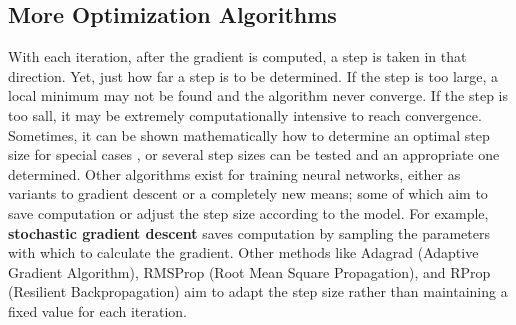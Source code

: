 \subsection{More Optimization Algorithms}

With each iteration, after the gradient is computed, a step is taken in that direction.  Yet, just how far a step is to be determined.  If the step is too large, a local minimum may not be found and the algorithm never converge.  If the step is too sall, it may be extremely computationally intensive to reach convergence.  Sometimes, it can be shown mathematically how to determine an optimal step size for special cases \cite{nar2018step}, or several step sizes can be tested \cite{Goodfellow-et-al-2016} and an appropriate one determined.  Other algorithms exist for training neural networks, either as variants to gradient descent or a completely new means; some of which aim to save computation or adjust the step size according to the model.  For example, \textbf{stochastic gradient descent} saves computation by sampling the parameters with which to calculate the gradient.  Other methods like Adagrad (Adaptive Gradient Algorithm), RMSProp (Root Mean Square Propagation), and RProp (Resilient Backpropagation)\cite{rproprprop} aim to adapt the step size rather than maintaining a fixed value for each iteration.